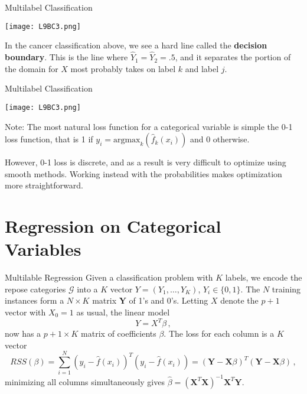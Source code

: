 \documentclass[10pt, table, dvipsnames,xcdraw, handout]{beamer}
\newcommand{\bfX}{\ensuremath{\mathbf{X}}}
\newcommand{\bfY}{\ensuremath{\mathbf{Y}}}
\begin{document}
\begin{frame}[fragile]{Multilabel Classification}
  \begin{minipage}[t][0.5\textheight][t]{\textwidth}
	\centering \texttt{[image: L9BC3.png]} 
  \end{minipage}
  \vfill
\begin{minipage}[t][0.5\textheight][t]{\textwidth}
In the cancer classification above, we see a hard line called the \textbf{decision boundary}. This is the line where $\hat{Y}_1 = \hat{Y}_2 = .5$, and it separates the portion of the domain for $X$ most probably takes on label $k$ and label $j$. 
\end{minipage}
\end{frame}


\begin{frame}[fragile]{Multilabel Classification}
  \begin{minipage}[t][0.5\textheight][t]{\textwidth}
	\centering \texttt{[image: L9BC3.png]} 
  \end{minipage}
  \vfill
\begin{minipage}[t][0.5\textheight][t]{\textwidth}
Note: The most natural loss function for a categorical variable is simple the 0-1 loss function, that is 1 if $y_i = \text{argmax}_k(\hat{f}_k(x_i))$ and 0 otherwise. 

However, 0-1 loss is discrete, and as a result is very difficult to optimize using smooth methods. Working instead with the probabilities makes optimization more straightforward. 
\end{minipage}
\end{frame}





\section{Regression on Categorical Variables}


\begin{frame}[fragile]{Multilable Regression}
Given a classification problem with $K$ labels, we encode the repose categories $\mathcal{G}$ into a $K$ vector $Y = (Y_1,\ldots, Y_K)$, $Y_i\in \{0,1\}$. The $N$ training instances form a $N\times K$ matrix $\bfY$ of 1's and 0's. \pause Letting $X$ denote the $p+1$ vector with $X_0 = 1$ as usual, the linear model
$$
Y = X^T\beta\,,
$$\pause
now has a $p+1\times K$ matrix of coefficients $\beta$. The loss for each column is a $K$ vector
$$
RSS(\beta) = \sum_{i=1}^N (y_i-\hat{f}(x_i))^T(y_i-\hat{f}(x_i)) = (\mathbf{Y} - \mathbf{X}\beta)^T(\mathbf{Y} - \mathbf{X}\beta)\,,
$$
minimizing all columns simultaneously gives $\hat \beta = (\bfX^T\bfX)^{-1}\bfX^T\bfY$.

\end{frame}
\end{document}
